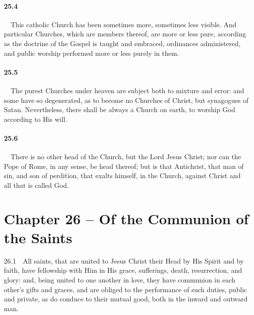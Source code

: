\paragraph{25.4}\ \ This catholic Church has been sometimes more, sometimes less visible. And particular Churches, which are members thereof, are more or less pure, according as the doctrine of the Gospel is taught and embraced, ordinances administered, and public worship performed more or less purely in them.   
\bigskip
\paragraph{25.5}\ \ The purest Churches under heaven are subject both to mixture and error: and some have so degenerated, as to become no Churches of Christ, but synagogues of Satan. Nevertheless, there shall be always a Church on earth, to worship God according to His will.   
\bigskip
\paragraph{25.6}\ \ There is no other head of the Church, but the Lord Jesus Christ; nor can the Pope of Rome, in any sense, be head thereof; but is that Antichrist, that man of sin, and son of perdition, that exalts himself, in the Church, against Christ and all that is called God.  

\section{Chapter 26 -- Of the Communion of the Saints} 26.1\ \ All saints, that are united to Jesus Christ their Head by His Spirit and by faith, have fellowship with Him in His grace, sufferings, death, resurrection, and glory: and, being united to one another in love, they have communion in each other's gifts and graces, and are obliged to the performance of such duties, public and private, as do conduce to their mutual good, both in the inward and outward man.   
\bigskip
